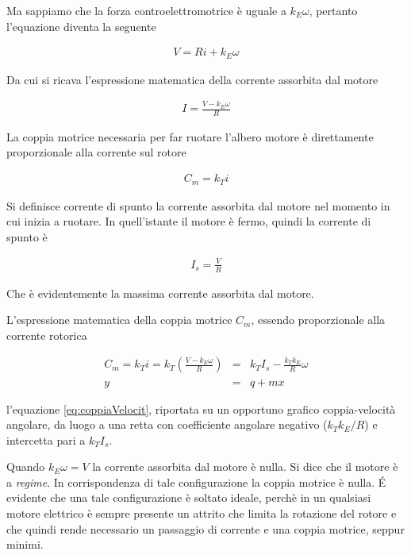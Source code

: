 \documentclass[17pt]{extarticle}
\begin{document}
Ma sappiamo che la forza controelettromotrice è uguale a $k_E\omega$, pertanto l'equazione diventa la seguente

\begin{eqnarray}
	V = Ri + k_E\omega
\end{eqnarray}

Da cui si ricava l'espressione matematica della corrente assorbita dal motore

\begin{eqnarray}
	I = \frac{V-k_E\omega}{R}
\end{eqnarray}

La coppia motrice necessaria per far ruotare l'albero motore è direttamente proporzionale alla corrente sul rotore

\begin{eqnarray}
	C_m = k_Ti
\end{eqnarray}


Si definisce corrente di spunto la corrente assorbita dal motore nel momento in cui inizia a ruotare. In quell'istante il motore è fermo, quindi la corrente di spunto è

\begin{eqnarray}
	I_s = \frac{V}{R}
\end{eqnarray}

Che è evidentemente la massima corrente assorbita dal motore.

L'espressione matematica della coppia motrice $C_m$, essendo proporzionale alla corrente rotorica 

\begin{eqnarray}\label{eq:coppiaVelocit}
	C_m = k_Ti = k_T\left( \frac{V-k_E\omega}{R} \right) & = & k_TI_s- \frac{k_Tk_E}{R}\omega  \\ \nonumber
	y & = & q +  mx 
\end{eqnarray}

l'equazione \ref{eq:coppiaVelocit}, riportata su un opportuno grafico coppia-velocità angolare, da luogo a una retta con coefficiente angolare negativo ($k_Tk_E/R$) e intercetta pari a $k_TI_s$.


Quando $k_E\omega = V$ la corrente assorbita dal motore è nulla. Si dice che il motore è a \emph{regime}. In corrispondenza di tale configurazione la coppia motrice è nulla. \'E evidente che una tale configurazione è soltato ideale, perchè in un qualsiasi motore elettrico è sempre presente un attrito che limita la rotazione del rotore e che quindi rende necessario un passaggio di corrente e una coppia motrice, seppur minimi.
\end{document}
